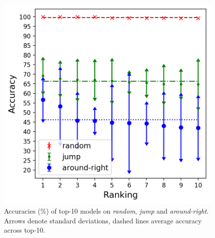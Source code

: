 
\begin{figure}[tb]
    \includegraphics[width=.45\textwidth,keepaspectratio]{figures/accuracies_all_splits.png}
    \centering
    \caption{Accuracies (\%) of top-10 models on \emph{random}, \emph{jump} and \emph{around-right}. Arrows
      denote standard deviations, dashed lines average accuracy across top-10.
      }
    \label{fig:exp1}
\end{figure}

